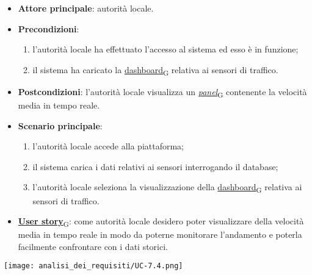 \begin{itemize}
	\item \textbf{Attore principale}: autorità locale.
	\item \textbf{Precondizioni}:
	      \begin{enumerate}
		      \item l'autorità locale ha effettuato l'accesso al sistema ed esso è in funzione;
		      \item il sistema ha caricato la \href{https://7last.github.io/docs/pb/documentazione-interna/glossario\#dashboard}{dashboard\textsubscript{G}} relativa ai sensori di traffico.
	      \end{enumerate}
	\item \textbf{Postcondizioni}: l'autorità locale visualizza un \href{https://7last.github.io/docs/pb/documentazione-interna/glossario\#panel}{\textit{panel}\textsubscript{G}} contenente la velocità media in tempo reale.
	\item \textbf{Scenario principale}:
	      \begin{enumerate}
		      \item l'autorità locale accede alla piattaforma;
		      \item il sistema carica i dati relativi ai sensori interrogando il database;
		      \item l'autorità locale seleziona la visualizzazione della \href{https://7last.github.io/docs/pb/documentazione-interna/glossario\#dashboard}{dashboard\textsubscript{G}} relativa ai sensori di traffico.
	      \end{enumerate}
	\item \href{https://7last.github.io/docs/pb/documentazione-interna/glossario\#user-story}{\textbf{User story}\textsubscript{G}}:
	      come autorità locale desidero poter visualizzare della velocità media in tempo reale in modo da poterne monitorare l'andamento
	      e poterla facilmente confrontare con i dati storici.
\end{itemize}
\begin{center}
	\texttt{[image: analisi\_dei\_requisiti/UC-7.4.png]}
\end{center}


